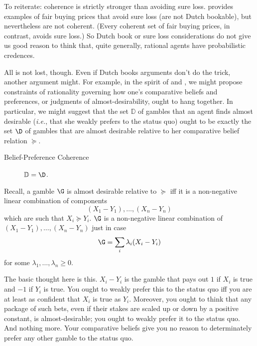 To reiterate: coherence is strictly stronger than avoiding sure loss. \citet[Section 2.4]{Walley1991} provides examples of fair buying prices that avoid sure loss (are not Dutch bookable), but nevertheless are not coherent. (Every coherent set of fair buying prices, in contrast, avoids sure loss.) So Dutch book or sure loss considerations do not give us good reason to think that, quite generally, rational agents have probabilistic credences.

All is not lost, though. Even if Dutch books arguments don't do the trick, another argument might. For example, in the spirit of \citet{Icard2016} and \citet[p. 338]{Fishburn1986}, we might propose constraints of rationality governing how one's comparative beliefs and preferences, or judgments of almost-desirability, ought to hang together. In particular, we might suggest that the set $\mathbb{D}$ of gambles that an agent finds almost desirable (\textit{i.e.}, that she weakly prefers to the status quo) ought to be exactly the set $\D$ of gambles that are almost desirable relative to her comparative belief relation $\succeq$. 
\begin{description}
\item[Belief-Preference Coherence] $\mathbb{D}=\D$.
\end{description}
Recall, a gamble $\G$ is almost desirable relative to $\succeq$ iff it is a non-negative linear combination of components
\[
(X_1-Y_1),\hdots,(X_n-Y_n)
\]
which are such that $X_i\succeq Y_i$. $\G$ is a non-negative linear combination of $(X_1-Y_1),\hdots,(X_n-Y_n)$ just in case
\[
\G=\sum_i \lambda_i(X_i-Y_i)
\]
for some $\lambda_1,\hdots,\lambda_n\geq0$.

The basic thought here is this. $X_i-Y_i$ is the gamble that pays out \textsterling$1$ if $X_i$ is true and $-$\textsterling$1$ if $Y_i$ is true. You ought to weakly prefer this to the status quo iff you are at least as confident that $X_i$ is true as $Y_i$. Moreover, you ought to think that any package of such bets, even if their stakes are scaled up or down by a positive constant, is almost-desirable; you ought to weakly prefer it to the status quo. And nothing more. Your comparative beliefs give you no reason to determinately prefer any other gamble to the status quo.

